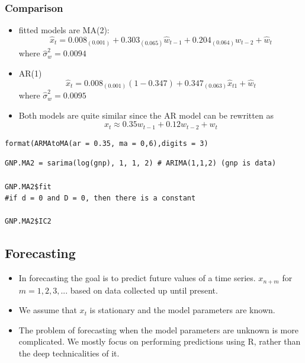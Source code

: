 \documentclass{article}
\begin{document}
\subsubsection{Comparison}
\begin{itemize}
    \item fitted models are MA(2):
    \begin{equation*}
        \hat{x}_t = 0.008_{(0.001)} + 0.303_{(0.065)}\hat{w}_{t-1} + 0.204_{(0.064)}\hat{w}_{t-2} + \hat{w}_t
    \end{equation*}
    where $\hat{\sigma}^2_w = 0.0094$
    \item AR(1)
    \begin{equation*}
        \hat{x}_t = 0.008_{(0.001)} (1-0.347) + 0.347_{(0.063)}\hat{x}_{t1} + \hat{w}_t
    \end{equation*}
    where $\hat{\sigma}^2_w = 0.0095$
    \item Both models are quite similar since the AR model can be rewritten as
    \begin{equation*}
        x_t \approx 0.35 w_{t-1} +0.12 w_{t-2} + w_t
    \end{equation*}
\end{itemize}


\begin{lstlisting}
format(ARMAtoMA(ar = 0.35, ma = 0,6),digits = 3)
\end{lstlisting}

\begin{lstlisting}
GNP.MA2 = sarima(log(gnp), 1, 1, 2) # ARIMA(1,1,2) (gnp is data)

GNP.MA2$fit
#if d = 0 and D = 0, then there is a constant

GNP.MA2$IC2
\end{lstlisting}


\subsection{Forecasting}

\begin{itemize}
    \item In forecasting the goal is to predict future values of a time series. $x_{n+m} $ for $m = 1,2,3,...$ based on data collected up until present.
    \item We assume that $x_t$ is stationary and the model parameters are known.
    \item The problem of forecasting when the model parameters are unknown is more complicated. We mostly focus on performing predictions using R, rather than the deep technicalities of it.
\end{itemize}
\end{document}
